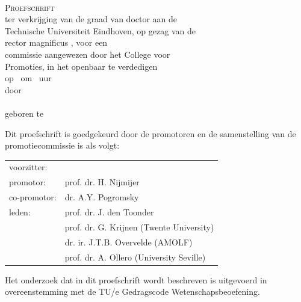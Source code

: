 \newpage
\thispagestyle{empty}



\vspace*{30mm}
\begin{center}
{\LARGE\sf\maintitle}\\[30mm] %
{\large\textsc{Proefschrift}}\\[8mm]
ter verkrijging van de graad van doctor aan de\\
Technische Universiteit Eindhoven, op gezag van de\\
rector magnificus \rector, voor een\\
commissie aangewezen door het College voor\\
Promoties, in het openbaar te verdedigen\\
op \ om \ uur\\[8mm]
door\\[8mm]
\@author\\[8mm]
geboren te \placeofbirth
\end{center}
\vfill

\newpage
\thispagestyle{empty}

\noindent
Dit proefschrift is goedgekeurd door de promotoren en de samenstelling van de promotiecommissie is als volgt:\\[7mm]

\noindent
\begin{tabular}{@{}l p{9.8cm}}
voorzitter:                 &                   \\
promotor:                   &   prof. dr. H. Nijmijer \\
co-promotor:                &   dr. A.Y. Pogromsky \\
leden:                      &   prof. dr. J. den Toonder \\
                            &   prof. dr. G. Krijnen (Twente University) \\
                            &   dr. ir. J.T.B. Overvelde (AMOLF) \\
                            &   prof. dr. A.  Ollero (University Seville) \\
\end{tabular}

\vfill
\noindent
Het onderzoek dat in dit proefschrift wordt beschreven is uitgevoerd in overeenstemming met de TU/e Gedragscode Wetenschapsbeoefening.
